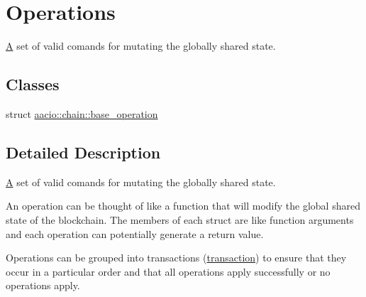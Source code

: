 \hypertarget{group__operations}{}\section{Operations}
\label{group__operations}


\mbox{\hyperlink{struct_a}{A}} set of valid comands for mutating the globally shared state.  


\subsection*{Classes}
\begin{DoxyCompactItemize}
\item 
struct \mbox{\hyperlink{structaacio_1_1chain_1_1base__operation}{aacio\+::chain\+::base\+\_\+operation}}
\end{DoxyCompactItemize}


\subsection{Detailed Description}
\mbox{\hyperlink{struct_a}{A}} set of valid comands for mutating the globally shared state. 

An operation can be thought of like a function that will modify the global shared state of the blockchain. The members of each struct are like function arguments and each operation can potentially generate a return value.

Operations can be grouped into transactions (\mbox{\hyperlink{structaacio_1_1chain_1_1transaction}{transaction}}) to ensure that they occur in a particular order and that all operations apply successfully or no operations apply.

